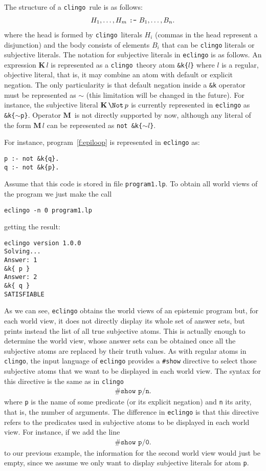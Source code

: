 \documentclass{new_tlp}
\def\K{\mathbf{K}\, }
\def\M{\mathbf{M}\, }
\let\sneg\relax
\newcommand{\sneg}{\ensuremath{\text{-}}}
\def\eclingo{{\tt eclingo}}
\def\clingo{{\tt clingo}}
\begin{document}
The structure of a \clingo\ rule is as follows:
\begin{align*}
    H_1,\dots,H_m  \text{ \texttt{:-} }  B_1,\dots,B_n.
\end{align*}
where the head is formed by \clingo\ literals $H_i$ (commas in the head represent a disjunction) and
the body consists of elements $B_i$ that can be \clingo{} literals or subjective literals.
%
The notation for subjective literals in \eclingo{} is as follows.
%
An expression $\K l$ is represented as a \clingo\ theory atom {\tt \&k\{$l$\}} where $l$ is a regular, objective literal, that is, it may combine an atom with default or explicit negation.
%
The only particularity is that default negation inside a {\tt \&k} operator must be represented as $\sim$ (this limitation will be changed in the future).
%
For instance, the subjective literal $\K \Not\, \sneg p$ is currently represented in \eclingo{} as \mbox{\tt \&k\{$\sim$\sneg p\}}.
%
Operator $\M$ is not directly supported by now, although any literal of the form $\M l$ can be represented as {\tt not \&k\{$\sim l$\}}.

For instance, program~\eqref{f:epiloop} is represented in \eclingo{} as:
\begin{Verbatim}[frame=single]
p :- not &k{q}.
q :- not &k{p}.
\end{Verbatim}

Assume that this code is stored in file {\tt program1.lp}.
%
To obtain all world views of the program we just make the call
\begin{verbatim}
eclingo -n 0 program1.lp
\end{verbatim}
getting the result:
\begin{Verbatim}[frame=single]
eclingo version 1.0.0
Solving...
Answer: 1
&k{ p }
Answer: 2
&k{ q }
SATISFIABLE
\end{Verbatim}
As we can see, \eclingo{} obtains the world views of an epistemic program but, for each world view, it does not directly display its whole set of answer sets, but prints instead the list of all true subjective atoms.
%
This is actually enough to determine the world view, whose answer sets can be obtained once all the subjective atoms are replaced by their truth values.
%
As with regular atoms in \clingo,
the input language of  \eclingo{} provides a {\tt \#show} directive to select those subjective atoms that we want to be displayed in each world view.
%
The syntax for this directive is the same as in \clingo{}
\begin{align*}
    \texttt{\#show p/n.}
\end{align*}
where {\tt p} is the name of some predicate (or its explicit negation) and {\tt n} its arity, that is, the number of arguments.
%
The difference in \eclingo{} is that this directive refers to the predicates used in subjective atoms to be displayed in each world view.
For instance, if we add the line
\begin{align*}
    \texttt{\#show p/0.}
\end{align*}
to our previous example, the information for the second world view would just be empty, since we assume we only want to display subjective literals for atom {\tt p}.
\end{document}
